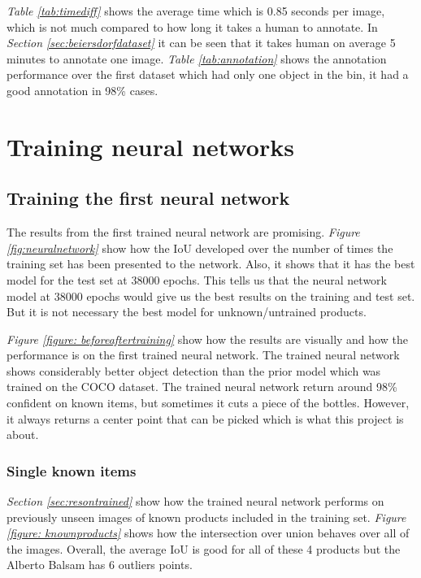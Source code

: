 \textit{Table \ref{tab:timediff}} shows the average time which is 0.85 seconds per image, which is not much compared to how long it takes a human to annotate. In \textit{Section \ref{sec:beiersdorfdataset}} it can be seen that it takes human on average 5 minutes to annotate one image. \textit{Table \ref{tab:annotation}} shows the annotation performance over the first dataset which had only one object in the bin, it had a good annotation in 98\% cases.



\section{Training neural networks} 
\subsection{Training the first neural network}
The results from the first trained neural network are promising. \textit{Figure \ref{fig:neuralnetwork}} show how the IoU developed over the number of times the training set has been presented to the network. Also, it shows that it has the best model for the test set at 38000 epochs. This tells us that the neural network model at 38000 epochs would give us the best results on the training and test set. But it is not necessary the best model for unknown/untrained products.

\textit{Figure \ref{figure: beforeaftertraining}} show how the results are visually and how the performance is on the first trained neural network. The trained neural network shows considerably better object detection than the prior model which was trained on the COCO dataset. The trained neural network return around 98\% confident on known items, but sometimes it cuts a piece of the bottles. However, it always returns a center point that can be picked which is what this project is about. 


\subsubsection{Single known items}
\textit{Section \ref{sec:resontrained}} show how the trained neural network performs on previously unseen images of known products included in the training set. \textit{Figure \ref{figure: knownproducts}} shows how the intersection over union behaves over all of the images. Overall, the average IoU is good for all of these 4 products but the Alberto Balsam has 6 outliers points.%

